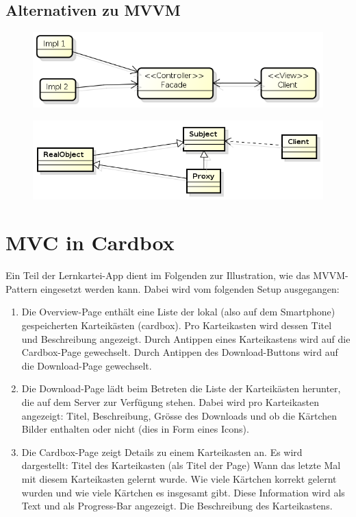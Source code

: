 \documentclass[a4paper,10pt]{scrreprt}
\begin{document}
\subsection{Alternativen zu MVVM}
\begin{figure}[h!]
 \centering
 \includegraphics[scale=.40]{./fpat.png}
\end{figure}
\begin{figure}[h!]
 \centering
 \includegraphics[scale=.40]{./proxy.png}
\end{figure}
\section{MVC in Cardbox}
Ein Teil der Lernkartei-App dient im Folgenden zur Illustration, wie das MVVM-Pattern eingesetzt werden kann.
Dabei wird vom folgenden Setup ausgegangen:

\begin{enumerate}
\item Die Overview-Page enthält eine Liste der lokal (also auf dem Smartphone) gespeicherten Karteikästen
(cardbox). Pro Karteikasten wird dessen Titel und Beschreibung angezeigt.
Durch Antippen eines Karteikastens wird auf die Cardbox-Page gewechselt.
Durch Antippen des Download-Buttons wird auf die Download-Page gewechselt.
\item Die Download-Page lädt beim Betreten die Liste der Karteikästen herunter, die auf dem Server zur
Verfügung stehen. Dabei wird pro Karteikasten angezeigt: Titel, Beschreibung, Grösse des Downloads und
ob die Kärtchen Bilder enthalten oder nicht (dies in Form eines Icons).
\item  Die Cardbox-Page zeigt Details zu einem Karteikasten an. Es wird dargestellt:
\subitem Titel des Karteikasten (als Titel der Page)
\subitem Wann das letzte Mal mit diesem Karteikasten gelernt wurde.
\subitem Wie viele Kärtchen korrekt gelernt wurden und wie viele Kärtchen es insgesamt gibt. Diese
Information wird als Text und als Progress-Bar angezeigt.
\subitem Die Beschreibung des Karteikastens.
\end{enumerate}
\end{document}
